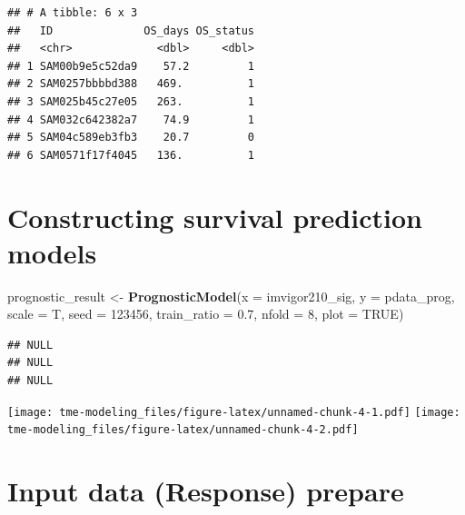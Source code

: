 \documentclass[
  12pt,
]{book}
\newenvironment{Shaded}{\begin{snugshade}}{\end{snugshade}}
\newcommand{\AttributeTok}[1]{\textcolor[rgb]{0.13,0.29,0.53}{#1}}
\newcommand{\ConstantTok}[1]{\textcolor[rgb]{0.56,0.35,0.01}{#1}}
\newcommand{\DecValTok}[1]{\textcolor[rgb]{0.00,0.00,0.81}{#1}}
\newcommand{\FloatTok}[1]{\textcolor[rgb]{0.00,0.00,0.81}{#1}}
\newcommand{\FunctionTok}[1]{\textcolor[rgb]{0.13,0.29,0.53}{\textbf{#1}}}
\newcommand{\NormalTok}[1]{#1}
\newcommand{\OtherTok}[1]{\textcolor[rgb]{0.56,0.35,0.01}{#1}}
\begin{document}
\begin{verbatim}
## # A tibble: 6 x 3
##   ID              OS_days OS_status
##   <chr>             <dbl>     <dbl>
## 1 SAM00b9e5c52da9    57.2         1
## 2 SAM0257bbbbd388   469.          1
## 3 SAM025b45c27e05   263.          1
## 4 SAM032c642382a7    74.9         1
## 5 SAM04c589eb3fb3    20.7         0
## 6 SAM0571f17f4045   136.          1
\end{verbatim}

\hypertarget{constructing-survival-prediction-models}{%
\section{Constructing survival prediction models}\label{constructing-survival-prediction-models}}

\begin{Shaded}
\begin{Highlighting}[]
\NormalTok{prognostic\_result }\OtherTok{\textless{}{-}} \FunctionTok{PrognosticModel}\NormalTok{(}\AttributeTok{x           =}\NormalTok{ imvigor210\_sig, }
                                     \AttributeTok{y           =}\NormalTok{ pdata\_prog, }
                                     \AttributeTok{scale       =}\NormalTok{ T, }
                                     \AttributeTok{seed        =} \DecValTok{123456}\NormalTok{, }
                                     \AttributeTok{train\_ratio =} \FloatTok{0.7}\NormalTok{, }
                                     \AttributeTok{nfold       =} \DecValTok{8}\NormalTok{,}
                                     \AttributeTok{plot        =} \ConstantTok{TRUE}\NormalTok{)}
\end{Highlighting}
\end{Shaded}

\begin{verbatim}
## NULL
## NULL
## NULL
\end{verbatim}

\texttt{[image: tme-modeling\_files/figure-latex/unnamed-chunk-4-1.pdf]} \texttt{[image: tme-modeling\_files/figure-latex/unnamed-chunk-4-2.pdf]}

\hypertarget{input-data-response-prepare}{%
\section{Input data (Response) prepare}\label{input-data-response-prepare}}
\end{document}
